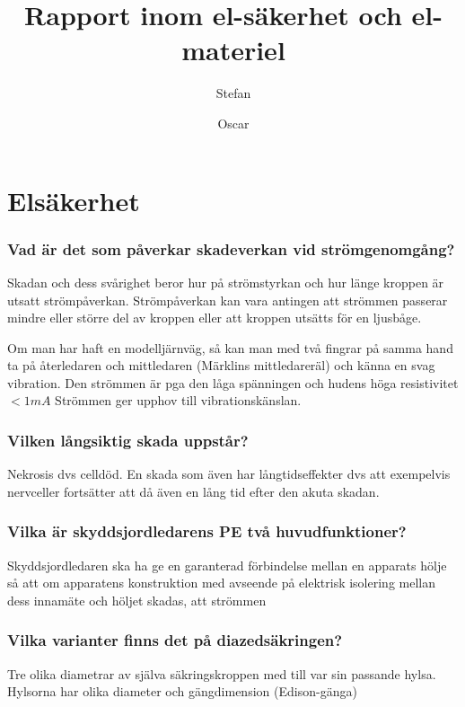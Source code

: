 \documentclass[a4paper,swedish]{article}
\title{Rapport inom el-säkerhet och el-materiel}
\author{Stefan}
\author{Oscar}
\begin{document}
\part{Elsäkerhet}
\setcounter{section}{1}
\section{Vad är det som påverkar skadeverkan vid strömgenomgång?} \label{sec:strömgenomgång}

Skadan och dess svårighet beror hur på strömstyrkan och hur länge kroppen är utsatt strömpåverkan.
Strömpåverkan kan vara antingen att strömmen passerar mindre eller större del av kroppen eller att kroppen
utsätts för en ljusbåge.

Om man har haft en modelljärnväg, så kan man med två fingrar på samma hand ta på återledaren och mittledaren (Märklins mittledareräl) och känna en svag
vibration. Den strömmen är pga den låga spänningen och hudens höga resistivitet $< 1 mA$
Strömmen ger upphov till vibrationskänslan.

\setcounter{section}{3}
\section{Vilken långsiktig skada uppstår?}\label{sec:permanent_skada}

Nekrosis dvs celldöd. En skada som även har långtidseffekter dvs att exempelvis nervceller
fortsätter att då även en lång tid efter den akuta skadan.

\setcounter{section}{5}
\section{Vilka är skyddsjordledarens PE två huvudfunktioner?}\label{sec:skyddsjordsledarens_funktioner}

Skyddsjordledaren ska ha ge en garanterad förbindelse mellan en apparats hölje så att om apparatens konstruktion
med avseende på elektrisk isolering mellan dess innamäte och höljet skadas, att strömmen

\setcounter{section}{7}
\section{Vilka varianter finns det på diazedsäkringen?}\label{sec:diazedvarianter}

Tre olika diametrar av själva säkringskroppen med till var sin passande hylsa.
Hylsorna har olika diameter och gängdimension (Edison-gänga)
\end{document}
